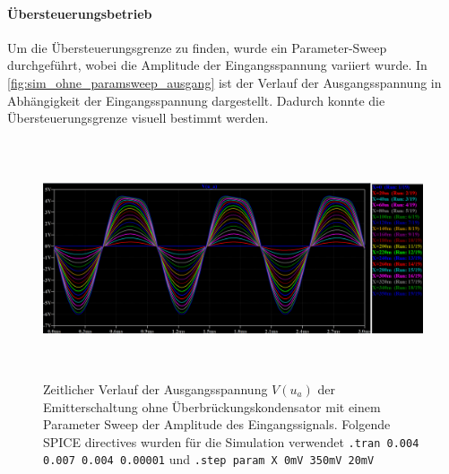 \documentclass[12pt,english,ngerman]{scrartcl}
\begin{document}

\paragraph{Übersteuerungsbetrieb}

Um die Übersteuerungsgrenze zu finden, wurde ein Parameter-Sweep durchgeführt,
wobei die Amplitude der Eingangsspannung variiert wurde. In 
\autoref{fig:sim_ohne_paramsweep_ausgang} ist der Verlauf der Ausgangsspannung
in Abhängigkeit der Eingangsspannung dargestellt. Dadurch konnte die
Übersteuerungsgrenze visuell bestimmt werden.

\begin{figure}[H]
    \centering
    \includegraphics[width=\linewidth, height=7cm]{./figures/ohnekond/parametersweepuebersteuerung.png}
    \caption{Zeitlicher Verlauf der Ausgangsspannung $V(u_a)$
    der Emitterschaltung ohne Überbrückungskondensator mit einem Parameter Sweep der Amplitude des Eingangssignals. 
    Folgende SPICE directives wurden für die Simulation verwendet
    \texttt{.tran 0.004 0.007 0.004 0.00001} und \texttt{.step param X 0mV 350mV 20mV}}
    \label{fig:sim_ohne_paramsweep_ausgang}
\end{figure}

\end{document}

